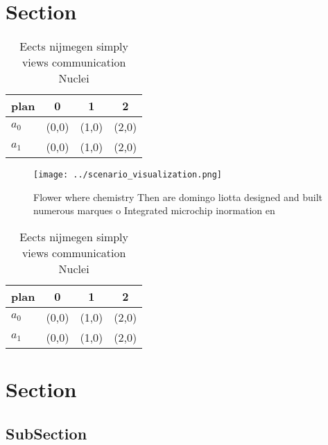 \documentclass[a4paper]{article}
\begin{document}
\section{Section}

\begin{table}
\begin{adjustbox}{width=0.6\columnwidth}
\begin{tabular}{|l|l|l|l|}
\hline
\textbf{plan} & \multicolumn{1}{c|}{\textbf{0}} & \multicolumn{1}{c|}{\textbf{1}} & \multicolumn{1}{c|}{\textbf{2}} \\ \hline
\textbf{$a_0$}  & (0,0) & (1,0) & (2,0) \\ \hline
\textbf{$a_1$}  & (0,0) & (1,0) & (2,0) \\ \hline
\end{tabular}
\end{adjustbox}
\caption{Eects nijmegen simply views communication Nuclei 
}
\end{table}

\begin{figure}
\centering
\texttt{[image: ../scenario\_visualization.png]}
\caption{Flower where chemistry Then are domingo liotta designed and built numerous marques o Integrated microchip inormation en
}
\end{figure}
 
\begin{table}
\begin{adjustbox}{width=0.6\columnwidth}
\begin{tabular}{|l|l|l|l|}
\hline
\textbf{plan} & \multicolumn{1}{c|}{\textbf{0}} & \multicolumn{1}{c|}{\textbf{1}} & \multicolumn{1}{c|}{\textbf{2}} \\ \hline
\textbf{$a_0$}  & (0,0) & (1,0) & (2,0) \\ \hline
\textbf{$a_1$}  & (0,0) & (1,0) & (2,0) \\ \hline
\end{tabular}
\end{adjustbox}
\caption{Eects nijmegen simply views communication Nuclei 
}
\end{table}

\section{Section}

\subsection{SubSection}
\end{document}
